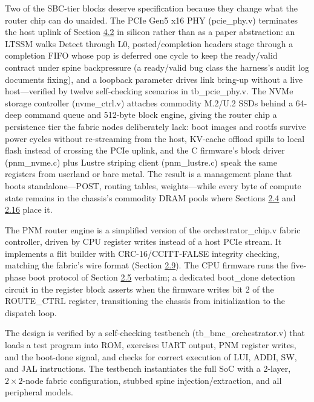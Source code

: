 \documentclass[12pt,onecolumn]{article}
\begin{document}
Two of the SBC-tier blocks deserve specification because they change what the router chip can do unaided. The PCIe Gen5 x16 PHY (pcie\_phy.v) terminates the host uplink of Section \hyperref[sec:4.2]{4.2} in silicon rather than as a paper abstraction: an LTSSM walks Detect through L0, posted/completion headers stage through a completion FIFO whose pop is deferred one cycle to keep the ready/valid contract under spine backpressure (a ready/valid bug class the harness's audit log documents fixing), and a loopback parameter drives link bring-up without a live host---verified by twelve self-checking scenarios in tb\_pcie\_phy.v. The NVMe storage controller (nvme\_ctrl.v) attaches commodity M.2/U.2 SSDs behind a 64-deep command queue and 512-byte block engine, giving the router chip a persistence tier the fabric nodes deliberately lack: boot images and rootfs survive power cycles without re-streaming from the host, KV-cache offload spills to local flash instead of crossing the PCIe uplink, and the C firmware's block driver (pnm\_nvme.c) plus Lustre striping client (pnm\_lustre.c) speak the same registers from userland or bare metal. The result is a management plane that boots standalone---POST, routing tables, weights---while every byte of compute state remains in the chassis's commodity DRAM pools where Sections \hyperref[sec:2.4]{2.4} and \hyperref[sec:2.16]{2.16} place it.

The PNM router engine is a simplified version of the orchestrator\_chip.v fabric controller, driven by CPU register writes instead of a host PCIe stream. It implements a flit builder with CRC-16/CCITT-FALSE integrity checking, matching the fabric's wire format (Section \hyperref[sec:2.9]{2.9}). The CPU firmware runs the five-phase boot protocol of Section \hyperref[sec:2.5]{2.5} verbatim; a dedicated boot\_done detection circuit in the register block asserts when the firmware writes bit 2 of the ROUTE\_CTRL register, transitioning the chassis from initialization to the dispatch loop.

The design is verified by a self-checking testbench (tb\_bmc\_orchestrator.v) that loads a test program into ROM, exercises UART output, PNM register writes, and the boot-done signal, and checks for correct execution of LUI, ADDI, SW, and JAL instructions. The testbench instantiates the full SoC with a 2-layer, $2\times2$-node fabric configuration, stubbed spine injection/extraction, and all peripheral models.
\end{document}
